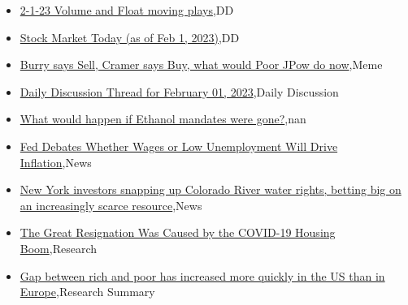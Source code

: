 \documentclass{article}%
\begin{document}
%
\begin{itemize}%
\item%
\href{https://reddit.com/r/wallstreetbets/comments/10qthw0/2123\_volume\_and\_float\_moving\_plays/}{2-1-23 Volume and Float moving plays},DD%
\item%
\href{https://reddit.com/r/wallstreetbets/comments/10qt0ti/stock\_market\_today\_as\_of\_feb\_1\_2023/}{Stock Market Today (as of Feb 1, 2023)},DD%
\item%
\href{https://reddit.com/r/wallstreetbets/comments/10qsoz6/burry\_says\_sell\_cramer\_says\_buy\_what\_would\_poor/}{Burry says Sell, Cramer says Buy, what would Poor JPow do now},Meme%
\item%
\href{https://reddit.com/r/wallstreetbets/comments/10qqkin/daily\_discussion\_thread\_for\_february\_01\_2023/}{Daily Discussion Thread for February 01, 2023},Daily Discussion%
\item%
\href{https://reddit.com/r/Economics/comments/10qeup5/what\_would\_happen\_if\_ethanol\_mandates\_were\_gone/}{What would happen if Ethanol mandates were gone?},nan%
\item%
\href{https://reddit.com/r/Economics/comments/10q7rp1/fed\_debates\_whether\_wages\_or\_low\_unemployment/}{Fed Debates Whether Wages or Low Unemployment Will Drive Inflation},News%
\item%
\href{https://reddit.com/r/Economics/comments/10q67h1/new\_york\_investors\_snapping\_up\_colorado\_river/}{New York investors snapping up Colorado River water rights, betting big on an increasingly scarce resource},News%
\item%
\href{https://reddit.com/r/Economics/comments/10q2irl/the\_great\_resignation\_was\_caused\_by\_the\_covid19/}{The Great Resignation Was Caused by the COVID-19 Housing Boom},Research%
\item%
\href{https://reddit.com/r/Economics/comments/10q1qih/gap\_between\_rich\_and\_poor\_has\_increased\_more/}{Gap between rich and poor has increased more quickly in the US than in Europe},Research Summary%
\end{itemize}%
\end{document}
